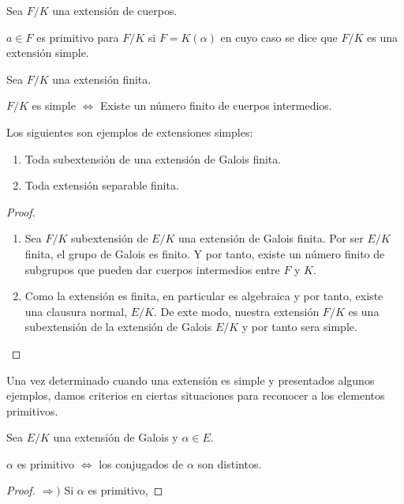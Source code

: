 \begin{definition}
Sea $F/K$ una extensión de cuerpos.

$a \in F$ es primitivo para $F/K$ si $F = K(\alpha)$ en cuyo caso se dice que $F/K$ es una extensión simple. 
\end{definition}

\begin{theorem}
Sea $F/K$ una extensión finita. 

$F/K$ es simple $\iff$ Existe un número finito de cuerpos intermedios. 
\end{theorem}

\begin{proposition}
Los siguientes son ejemplos de extensiones simples:

\begin{enumerate}
\item Toda subextensión de una extensión de Galois finita.
\item Toda extensión separable finita.
\end{enumerate}
\end{proposition}
\begin{proof}
\begin{enumerate}
\item Sea $F/K$ subextensión de $E/K$ una extensión de Galois finita. Por ser $E/K$ finita, el grupo de Galois es finito. Y por tanto, existe un número finito de subgrupos que pueden dar cuerpos intermedios entre $F$ y $K$. 
\item Como la extensión es finita, en particular es algebraica y por tanto, existe una clausura normal, $E/K$. De exte modo, nuestra extensión $F/K$ es una subextensión de la extensión de Galois $E/K$ y por tanto sera simple. 
\end{enumerate}
\end{proof}

Una vez determinado cuando una extensión es simple y presentados algunos ejemplos, damos criterios en ciertas situaciones para reconocer a los elementos primitivos.

\begin{proposition}
Sea $E/K$ una extensión de Galois y $\alpha \in E$.

$\alpha$ es primitivo $\iff$ los conjugados de $\alpha$ son distintos.
\end{proposition}
\begin{proof}
$\Rightarrow)$ Si $\alpha$ es primitivo, 
\end{proof}









